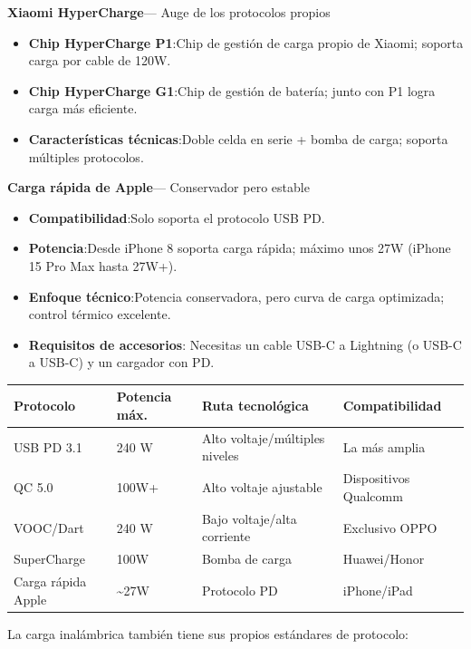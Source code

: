 \textbf{Xiaomi HyperCharge}— Auge de los protocolos propios

\begin{itemize}
  \item \textbf{Chip HyperCharge P1}:Chip de gestión de carga propio de Xiaomi; soporta carga por cable de 120W.
  \item \textbf{Chip HyperCharge G1}:Chip de gestión de batería; junto con P1 logra carga más eficiente.
  \item \textbf{Características técnicas}:Doble celda en serie + bomba de carga; soporta múltiples protocolos.
\end{itemize}

\textbf{Carga rápida de Apple}— Conservador pero estable

\begin{itemize}
  \item \textbf{Compatibilidad}:Solo soporta el protocolo USB PD.
  \item \textbf{Potencia}:Desde iPhone 8 soporta carga rápida; máximo unos 27W (iPhone 15 Pro Max hasta 27W+).
  \item \textbf{Enfoque técnico}:Potencia conservadora, pero curva de carga optimizada; control térmico excelente.
  \item \textbf{Requisitos de accesorios}: Necesitas un cable USB-C a Lightning (o USB-C a USB-C) y un cargador con PD.
\end{itemize}


\begin{center}
\begin{tabularx}{\linewidth}{|X|X|X|X|}
\hline
\textbf{Protocolo} & \textbf{Potencia máx.} & \textbf{Ruta tecnológica} & \textbf{Compatibilidad} \tabularnewline
\hline
USB PD 3.1 & 240 W & Alto voltaje/múltiples niveles & La más amplia \tabularnewline
QC 5.0 & 100W+ & Alto voltaje ajustable & Dispositivos Qualcomm \tabularnewline
VOOC/Dart & 240 W & Bajo voltaje/alta corriente & Exclusivo OPPO \tabularnewline
SuperCharge & 100W & Bomba de carga & Huawei/Honor \tabularnewline
Carga rápida Apple & \textasciitilde{}27W & Protocolo PD & iPhone/iPad \tabularnewline
\hline
\end{tabularx}
\end{center}


La carga inalámbrica también tiene sus propios estándares de protocolo:

